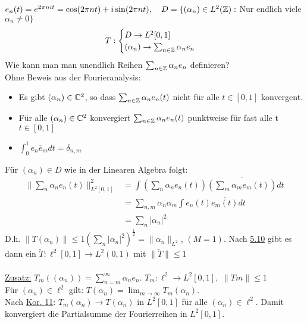 \begin{beispiel}
	$e_{n} (t) = e^{2 \pi n i t} = \cos(2 \pi n t) + i \sin(2 \pi n t), \quad D = \{ (\alpha_{n}) \in L^{2}(\mathbb{Z}):$ Nur endlich viele $\alpha_{n} \neq 0 \}$
	\[ T : \begin{cases} D \rightarrow L^{2}[0, 1] \\ (\alpha_{n}) \rightarrow \sum_{n \in \mathbb{Z}} \alpha_{n} e_{n} \end{cases} \]
	Wie kann man man unendlich Reihen $\sum_{n \in \mathbb{Z}} \alpha_{n} e_{n}$ definieren? \\
	Ohne Beweis aus der Fourieranalysis:
	\begin{itemize}
		\item Es gibt $(\alpha_{n}) \in \mathbb{C}^{2}$, so dass $\sum_{n \in \mathbb{Z}} \alpha_{n} e_{n}(t)$ nicht für alle $t \in [0, 1]$ konvergent.
		\item Für alle $(\alpha_{n}) \in \mathbb{C}^{2}$ konvergiert $\sum_{n \in \mathbb{Z}} \alpha_{n} e_{n}(t)$ punktweise für fast alle t $t \in [0, 1]$
		\item $\int_{0}^{1} e_{n} \overline e_{m} dt = \delta_{n, m}$
	\end{itemize}
	Für $(\alpha_{n}) \in D$ wie in der Linearen Algebra folgt:
	\begin{align*}
		\| \sum_{n} \alpha_{n} e_{n}(t) \|_{L^{2}[0, 1]}^{2} & = \int (\sum_{n} \alpha_{n} e_{n}(t)) \overline{(\sum_{m} \alpha_{m} e_{m}(t))} dt \\
		& = \sum_{n, m} \alpha_{n} \alpha_{m} \int e_{n}(t) \overline{e_{m}(t)} dt \\
		& = \sum_{n} |\alpha_{n}|^2
	\end{align*}
	D.h. $\| T (\alpha_{n}) \| \leq 1 \left( \sum_{n} |\alpha_{n}|^2 \right)^{\frac{1}{2}} = \| \alpha_{n} \|_{L^{2}}$, $(M = 1)$. Nach \hyperref[prop:5.10]{5.10} gibt es dann ein $\tilde T: \ell^{2}[0, 1] \rightarrow L^{2}(0, 1)$ mit $\| \tilde T \| \leq 1$ \\ \\
	\uline{Zusatz:} $T_{m}((\alpha_{n})) = \sum_{n = m}^{\infty} \alpha_{n} e_{n}$. $T_{m}: \ell^{2} \rightarrow L^{2}[0, 1],$ $\| Tm \| \leq 1$ \\
	Für $(\alpha_{n}) \in \ell^{2}$ gilt: $T (\alpha_{n}) = \lim_{m \rightarrow \infty} T_{m}(\alpha_{n})$. \\
	Nach \hyperref[kor:5.11]{Kor. 11}: $T_{m}(\alpha_{n}) \rightarrow T (\alpha_{n})$ in $L^{2}[0, 1]$ für alle $(\alpha_{n}) \in \ell^{2}$. Damit konvergiert die Partialsumme der Fourierreihen in $L^{2}[0, 1]$.
\end{beispiel}

